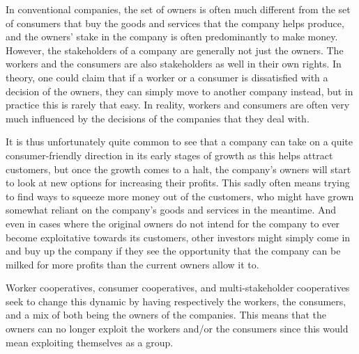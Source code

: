 \documentclass{article}
\begin{document}
In conventional companies, the set of owners is often much different from the set of consumers that buy the goods and services that the company helps produce, and the owners' stake in the company is often predominantly to make money. However, the stakeholders of a company are generally not just the owners. The workers and the consumers are also stakeholders as well in their own rights.
In theory, one could claim that if a worker or a consumer is dissatisfied with a decision of the owners, they can simply move to another company instead, but in practice this is rarely that easy. In reality, workers and consumers are often very much influenced by the decisions of the companies that they deal with. 
%

It is thus unfortunately quite common to see that a company can take on a quite consumer-friendly direction in its early stages of growth as this helps attract customers, but once the growth comes to a halt, the company's owners will start to look at new options for increasing their profits. This sadly often means trying to find ways to squeeze more money out of the customers, who might have grown somewhat reliant on the company's goods and services in the meantime. And even in cases where the original owners do not intend for the company to ever become exploitative towards its customers, other investors might simply come in and buy up the company if they see the opportunity that the company can be milked for more profits than the current owners allow it to.



Worker cooperatives, consumer cooperatives, and multi-stakeholder cooperatives seek to change this dynamic by having respectively the workers, the consumers, and a mix of both being the owners of the companies. This means that the owners can no longer exploit the workers and/or the consumers since this would mean exploiting themselves as a group. 
\end{document}
